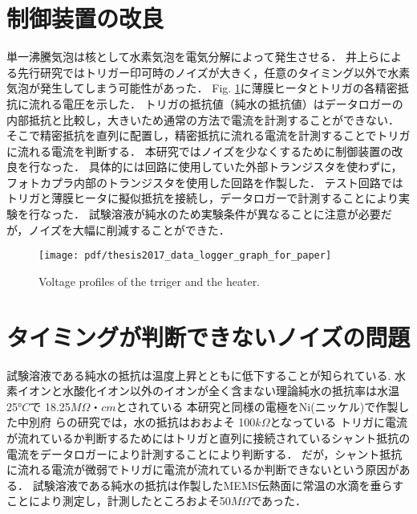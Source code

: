 \section{制御装置の改良}
単一沸騰気泡は核として水素気泡を電気分解によって発生させる．
井上ら\cite{Inoue2016}による先行研究ではトリガー印可時のノイズが大きく，任意のタイミング以外で水素気泡が発生してしまう可能性があった．
Fig. \ref{test circuit}に薄膜ヒータとトリガの各精密抵抗に流れる電圧を示した．
トリガの抵抗値（純水の抵抗値）はデータロガーの内部抵抗と比較し，大きいため通常の方法で電流を計測することができない．
そこで精密抵抗を直列に配置し，精密抵抗に流れる電流を計測することでトリガに流れる電流を判断する．
本研究ではノイズを少なくするために制御装置の改良を行なった．
具体的には回路に使用していた外部トランジスタを使わずに，フォトカプラ内部のトランジスタを使用した回路を作製した．
テスト回路ではトリガと薄膜ヒータに擬似抵抗を接続し，データロガーで計測することにより実験を行なった．
試験溶液が純水のため実験条件が異なることに注意が必要だが，ノイズを大幅に削減することができた．
\vspace{-1zh}
\begin{figure}[h]
 \begin{center}
  \texttt{[image: pdf/thesis2017\_data\_logger\_graph\_for\_paper]}
  \vspace{-2zh}
  \caption{Voltage profiles of the trriger and the heater.}\label{test circuit}
 \end{center}
\end{figure}

\newpage

\section{タイミングが判断できないノイズの問題}
試験溶液である純水の抵抗は温度上昇とともに低下することが知られている.
水素イオンと水酸化イオン以外のイオンが全く含まない理論純水の抵抗率は水温 25$°C$で 18.25$MΩ・cm$とされている\cite{Inoue2016}
本研究と同様の電極をNi(ニッケル)で作製した中別府 ら\cite{Nakabeppu2014}の研究では，水の抵抗はおおよそ 100$kΩ$となっている
トリガに電流が流れているか判断するためにはトリガと直列に接続されているシャント抵抗の電流をデータロガーにより計測することにより判断する．
だが，シャント抵抗に流れる電流が微弱でトリガに電流が流れているか判断できないという原因がある．
試験溶液である純水の抵抗は作製したMEMS伝熱面に常温の水滴を垂らすことにより測定し，計測したところおよそ50$MΩ$であった．



